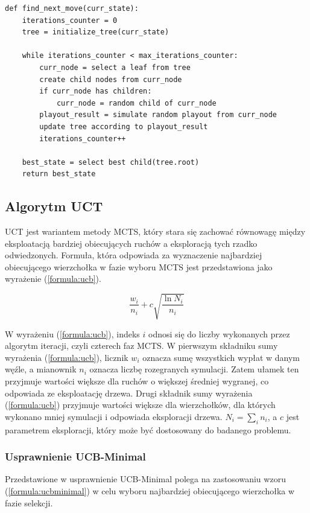 \documentclass[a4paper,12pt]{article}
\begin{document}
\begin{minipage}{\linewidth} %
	\begin{lstlisting}[caption={Pseudokod algorytmu Monte Carlo Tree Search}, label=lst:mcts, style=mystyle]
def find_next_move(curr_state):
	iterations_counter = 0
	tree = initialize_tree(curr_state)
	
	while iterations_counter < max_iterations_counter:
		curr_node = select a leaf from tree
		create child nodes from curr_node
		if curr_node has children:
			curr_node = random child of curr_node
		playout_result = simulate random playout from curr_node     
		update tree according to playout_result                     
		iterations_counter++
	
	best_state = select best child(tree.root) 
	return best_state
	\end{lstlisting}
\end{minipage}


\subsection{Algorytm UCT} \label{subsec:uct}
UCT jest wariantem metody MCTS, który stara się zachować równowagę między eksploatacją bardziej obiecujących ruchów a eksploracją tych rzadko odwiedzonych. Formuła, która odpowiada za wyznaczenie najbardziej obiecującego wierzchołka w fazie wyboru MCTS jest przedstawiona jako wyrażenie (\ref{formula:ucb}).

\begin{equation}\label{formula:ucb}
\frac{w_i}{n_i} + c \sqrt{\frac{\ln N_i}{n_i}}
\end{equation}

W wyrażeniu (\ref{formula:ucb}), indeks $i$ odnosi się do liczby wykonanych przez algorytm iteracji, czyli czterech faz MCTS. W pierwszym składniku sumy wyrażenia (\ref{formula:ucb}), licznik $w_i$ oznacza sumę wszystkich wypłat w danym węźle, a mianownik $n_i$ oznacza liczbę rozegranych symulacji. Zatem ułamek ten przyjmuje wartości większe dla ruchów o większej średniej wygranej, co odpowiada ze eksploatację drzewa. Drugi składnik sumy wyrażenia (\ref{formula:ucb}) przyjmuje wartości większe dla wierzchołków, dla których wykonano mniej symulacji i odpowiada eksploracji drzewa. $N_i=\sum_i n_i$, a $c$ jest parametrem eksploracji, który może być dostosowany do badanego problemu.


\subsubsection{Usprawnienie UCB-Minimal} \label{subsec:ucbmin}
Przedstawione w \cite{ucbminimal} usprawnienie UCB-Minimal polega na zastosowaniu wzoru (\ref{formula:ucbminimal}) w celu wyboru najbardziej obiecującego wierzchołka w fazie selekcji.
\end{document}
